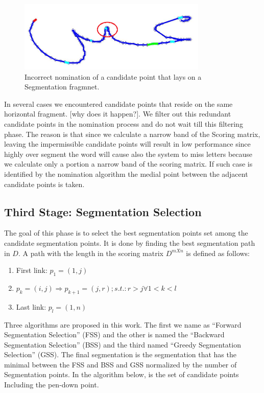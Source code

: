 \documentclass[12pt,journal,compsoc]{IEEEtran}
\begin{document}
\begin{figure}[h]
\centering
\includegraphics[width=9cm]{./figures/candidate_in_no_horizontal}
\caption{Incorrect nomination of a candidate point that lays on a Segmentation fragmnet.}
\label{fig:candidate_in_no_horizontal}
\end{figure}


In several cases we encountered candidate points that reside on the same horizontal fragment. [why does it happen?]. We filter out this redundant candidate points in the nomination process and do not wait till this filtering phase. The reason is that since we calculate a narrow band of the Scoring matrix, leaving the impermissible candidate points will result in low performance since highly over segment the word will cause also the system to miss letters because we calculate only a portion a narrow band of the scoring matrix. If such case is identified by the nomination algorithm the medial point between the adjacent candidate points is taken.

\subsection{Third  Stage: Segmentation Selection}
The goal of this phase is to select the best segmentation points set among the candidate segmentation points. It is done by finding the best segmentation path in $D$.
A path with the length in the scoring matrix $D^{mXn}$ is defined as follows:  
\begin{enumerate}
\item First link: $p_{1}=(1,j)$
\item $p_{k}=(i,j)\Rightarrow p_{k+1}=(j,r);s.t.:r>j \forall 1<k<l $
\item Last link: $p_{l}=(1,n)$
\end{enumerate}
Three algorithms are proposed in this work. The first we name as “Forward Segmentation Selection” (FSS) and the other is named the “Backward Segmentation Selection” (BSS) and the third named “Greedy Segmentation Selection” (GSS). The final segmentation is the segmentation that has the minimal between the FSS and BSS and GSS normalized by the number of Segmentation points. In the algorithm below, is the set of candidate points Including the pen-down point.  
\end{document}
